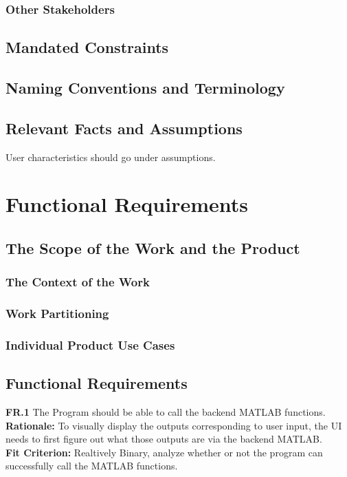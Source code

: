\documentclass[12pt]{article}
\begin{document}
\subsubsection{Other Stakeholders}

\subsection{Mandated Constraints}

\subsection{Naming Conventions and Terminology}

\subsection{Relevant Facts and Assumptions}

User characteristics should go under assumptions.

\section{Functional Requirements}

\subsection{The Scope of the Work and the Product}

\subsubsection{The Context of the Work}

\subsubsection{Work Partitioning}

\subsubsection{Individual Product Use Cases}

\subsection{Functional Requirements}
  \textbf{FR.1} The Program should be able to call the backend MATLAB functions. \\
  \textbf{Rationale:} To visually display the outputs corresponding to user input, the UI needs to first figure out what those outputs are via the backend MATLAB.\\
  \textbf{Fit Criterion:} Realtively Binary, analyze whether or not the program can successfully call the MATLAB functions.\\\\
  
\end{document}
